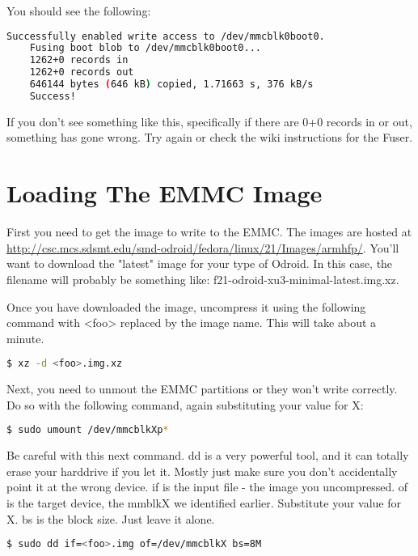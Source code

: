 You should see the following:
\begin{lstlisting}[language=bash]
    Successfully enabled write access to /dev/mmcblk0boot0.
	Fusing boot blob to /dev/mmcblk0boot0...
	1262+0 records in
	1262+0 records out
	646144 bytes (646 kB) copied, 1.71663 s, 376 kB/s
	Success!
\end{lstlisting}

If you don't see something like this, specifically if there are 0+0 records in or out, something has gone wrong. Try again or check the wiki instructions for the Fuser.

\section{Loading The EMMC Image}

First you need to get the image to write to the EMMC. The images are hosted at \url{http://csc.mcs.sdsmt.edu/smd-odroid/fedora/linux/21/Images/armhfp/}. You'll want to download the "latest" image for your type of Odroid. In this case, the filename will probably be something like: f21-odroid-xu3-minimal-latest.img.xz.

Once you have downloaded the image, uncompress it using the following command with <foo> replaced by the image name. This will take about a minute.

\begin{lstlisting}[language=bash]
  $ xz -d <foo>.img.xz
\end{lstlisting}

Next, you need to unmout the EMMC partitions or they won't write correctly. Do so with the following command, again substituting your value for X:

\begin{lstlisting}[language=bash]
  $ sudo umount /dev/mmcblkXp*
\end{lstlisting}

Be careful with this next command. dd is a very powerful tool, and it can totally erase your harddrive if you let it. Mostly just make sure you don't accidentally point it at the wrong device. if is the input file - the image you uncompressed. of is the target device, the mmblkX we identified earlier. Substitute your value for X. bs is the block size. Just leave it alone.

\begin{lstlisting}[language=bash]
  $ sudo dd if=<foo>.img of=/dev/mmcblkX bs=8M
\end{lstlisting}

